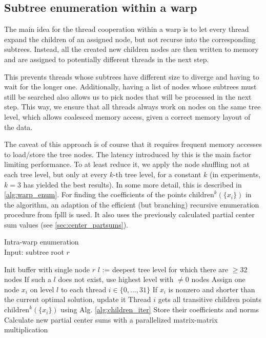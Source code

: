 \documentclass{scrartcl}
\begin{document}
    \subsection{Subtree enumeration within a warp}

    The main idea for the thread cooperation within a warp is to let every thread expand the children of an assigned node, but not recurse into the corresponding subtrees. Instead, all the created new children nodes are then written to memory and are assigned to potentially different threads in the next step.

    This prevents threads whose subtrees have different size to diverge and having to wait for the longer one. Additionally, having a list of nodes whose subtrees must still be searched also allows us to pick nodes that will be processed in the next step. This way, we ensure that all threads always work on nodes on the same tree level, which allows coalesced memory access, given a correct memory layout of the data.

    The caveat of this approach is of course that it requires frequent memory accesses to load/store the tree nodes. The latency introduced by this is the main factor limiting performance. To at least reduce it, we apply the node shuffling not at each tree level, but only at every $k$-th tree level, for a constant $k$ (in experiments, $k = 3$ has yielded the best results).
    In some more detail, this is described in \ref{alg:warp_enum}. For finding the coefficients of the points $\mathrm{children}^k(\{x_i\})$ in the algorithm, an adaption of the efficient (but branching) recursive enumeration procedure from fplll is used. It also uses the previously calculated partial center sum values (see \ref{sec:center_partsums}).

    \begin{algorithm}[H]
        \caption{Intra-warp enumeration \label{alg:warp_enum}\\Input: subtree root $r$}
        \begin{algorithmic}
            \STATE Init buffer with single node $r$
                \STATE $l$ := deepest tree level for which there are $\geq 32$ nodes
                \STATE If such a $l$ does not exist, use highest level with $\neq 0$ nodes
                \STATE Assign one node $x_i$ on level $l$ to each thread $i \in \{0, ..., 31\}$
                    \STATE If $x_i$ is nonzero and shorter than the current optimal solution, update it
                \ELSE
                    \STATE Thread $i$ gets all transitive children points $\mathrm{children}^k(\{x_i\})$ using Alg. \ref{alg:children_iter}
                    \STATE Store their coefficients and norms
                    \STATE Calculate new partial center sums with a parallelized matrix-matrix multiplication
                \ENDIF
                \ENDWHILE
        \end{algorithmic}
    \end{algorithm}
\end{document}
